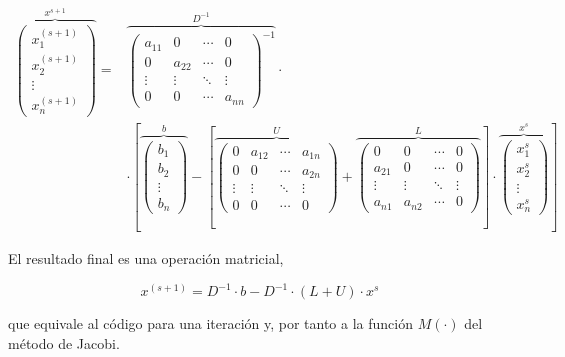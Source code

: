  \begin{align*}
 \overbrace{\begin{pmatrix}
x_1^{(s+1)}\\
x_2^{(s+1)}\\
\vdots \\
x_n^{(s+1)}
\end{pmatrix}}^{x^{s+1}}= &
\overbrace{\begin{pmatrix}
a_{11}& 0& \cdots & 0\\
0& a_{22}& \cdots & 0\\
\vdots & \vdots & \ddots & \vdots\\
0& 0& \cdots & a_{nn}
\end{pmatrix}^{-1}}^{D^{-1}} \cdot\\
&\cdot \left[ \overbrace{\begin{pmatrix}
b_1\\
b_2\\
\vdots \\
b_n
\end{pmatrix}}^b- \left[\overbrace{\begin{pmatrix}
0& a_{12}& \cdots & a_{1n}\\
0& 0& \cdots & a_{2n}\\
\vdots & \vdots & \ddots & \vdots\\
0& 0& \cdots & 0
\end{pmatrix}}^U+
\overbrace{\begin{pmatrix}
0& 0& \cdots & 0\\
a_{21}& 0& \cdots & 0\\
\vdots & \vdots & \ddots & \vdots\\
a_{n1}& a_{n2}& \cdots & 0
\end{pmatrix}}^L \right] \cdot \overbrace{\begin{pmatrix}
x_1^s\\
x_2^s\\
\vdots \\
x_n^s
\end{pmatrix}}^{x^s}\right]  
\end{align*}

El resultado final es una operación matricial,

\begin{equation*}
x^{(s+1)}=D^{-1}\cdot b- D^{-1}\cdot\left(L+U\right)\cdot x^s
\end{equation*}

que equivale al código para una iteración y, por tanto a la función $M(\cdot)$ del método de Jacobi. 

